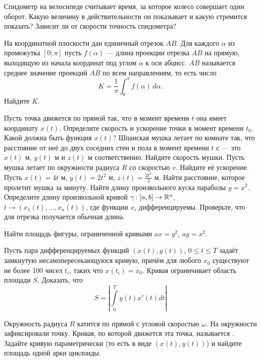 \documentclass[12pt]{article}
\begin{document}


 Спидометр на велосипеде считывает время, за которое колесо совершает один
оборот.
Какую величину в действительности он показывает и какую стремится показать?
Зависит ли от скорости точность спидометра?


На координатной плоскости дан единичный отрезок $AB$.
Для каждого $\alpha$ из промежутка $[0;\pi]$ пусть $f(\alpha)$ ---
длина проекции отрезка $AB$ на прямую, выходящую из начала координат под
углом $\alpha$ к оси абцисс.
 $AB$ называется среднее значение проекций $AB$
по всем направлениям, то есть число
$$
K=\frac{1}{\pi}\int_0^{\pi}f(\alpha)\, d\alpha.
$$
Найдите $K$.


 Пусть точка движется по прямой так, что в момент времени $t$ она имеет координату $x(t)$.
Определите скорость и ускорение точки в момент времени $t_0$. Какой должна быть функция $x(t)$?
 Шпанская мушка летает по комнате так, что расстояние от неё до двух соседних стен
и пола  в момент времени $t$ с --- это $x(t)$ м, $y(t)$ м и $z(t)$ м соответственно. Найдите скорость мушки.
 Пусть мушка летает по окружности радиуса $R$ со скоростью $v$. Найдите её ускорение.
 Пусть $x(t) = 4t$ м, $y(t) = 2t^2$ м, $z(t) = \frac{2t^3}{3}$ м. Найти расстояние, которое пролетит мушка за минуту.
 Найти длину произвольного куска параболы $y=x^2$.
 Определите длину произвольной кривой $\gamma \colon [a,b] \rightarrow \mathbb{R}^n$, $t \to (x_1(t),\ldots,x_n(t))$, где функции $x_i$ дифференцируемы. Проверьте, что для отрезка получается обычная длина.


Найти площадь фигуры, ограниченной кривыми $ax = y^2$, $ay=x^2$.

 Пусть пара дифференцируемых функций $(x(t),y(t))$, $0\leqslant t \leqslant T$ задаёт замкнутую
несамопересекающуюся кривую, причём для любого $x_0$ существуют не более 100
чисел $t_i$, таких что $x(t_i) = x_0$. Кривая ограничивает область площади $S$.
Доказать, что
\vspace{-3mm}
$$S = \left| \int\limits_0^T y(t) x'(t) dt \right|$$

Окружность радиуса $R$ катится по прямой с угловой скоростью $\omega$. На окружности зафиксировали точку. Кривая, по которой движется эта точка, называется . Задайте кривую параметрически (то есть в виде $(x(t),y(t))$) и найдите площадь одной арки циклоиды.
\end{document}
